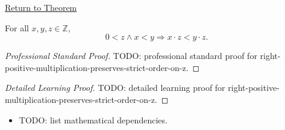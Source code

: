 \newpage
{}
\label{prf:right-positive-multiplication-preserves-strict-order-on-z}

\begin{remark*}[Return]
\hyperref[cor:right-positive-multiplication-preserves-strict-order-on-z]{Return to Theorem}
\end{remark*}

\begin{corollary*}
For all $x,y,z\in\mathbb{Z}$,
\[
0<z\land x<y \Longrightarrow x\cdot z<y\cdot z.
\]
\end{corollary*}

\begin{proof}[Professional Standard Proof]
\LRAProofBodyStart
TODO: professional standard proof for right-positive-multiplication-preserves-strict-order-on-z.
\end{proof}

\begin{proof}[Detailed Learning Proof]
\LRAProofBodyStart
TODO: detailed learning proof for right-positive-multiplication-preserves-strict-order-on-z.
\end{proof}

\begin{remark*}
\end{remark*}

\begin{dependencies}
\begin{itemize}
  \item TODO: list mathematical dependencies.
\end{itemize}
\end{dependencies}

\clearpage
